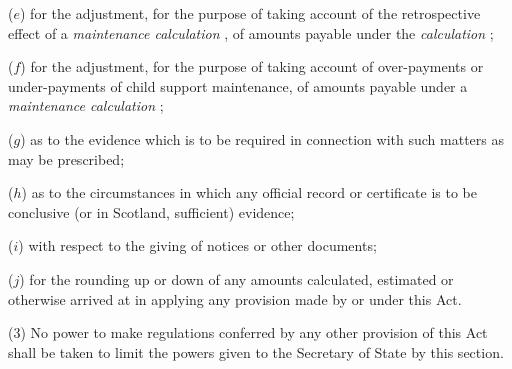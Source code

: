 \documentclass[12pt,a4paper]{article}
\begin{document}
\begin{enumerate}
($e$) for the adjustment, for the purpose of taking account of the retrospective effect of a 
\emph{maintenance calculation}%
, of amounts payable under the 
\emph{calculation}%
;

($f$) for the adjustment, for the purpose of taking account of over-payments or under-payments of child support maintenance, of amounts payable under a 
\emph{maintenance calculation}%
;

($g$) as to the evidence which is to be required in connection with such matters as may be prescribed;

($h$) as to the circumstances in which any official record or certificate is to be conclusive (or in Scotland, sufficient) evidence;

($i$) with respect to the giving of notices or other documents;

($j$) for the rounding up or down of any amounts calculated, estimated or otherwise arrived at in applying any provision made by or under this Act.
\end{enumerate}

(3) No power to make regulations conferred by any other provision of this Act shall be taken to limit the powers given to the Secretary of State by this section.

\end{document}
